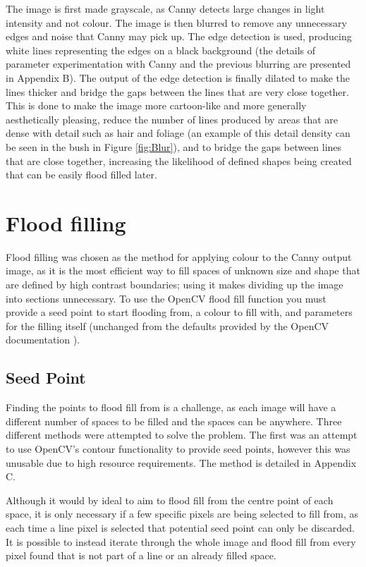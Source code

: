The image is first made grayscale, as Canny detects large changes in light intensity and not colour. The image is then blurred to remove any unnecessary edges and noise that Canny may pick up. The edge detection is used, producing white lines representing the edges on a black background (the details of parameter experimentation with Canny and the previous blurring are presented in Appendix B). The output of the edge detection is finally dilated to make the lines thicker and bridge the gaps between the lines that are very close together. This is done to make the image more cartoon-like and more generally aesthetically pleasing, reduce the number of lines produced by areas that are dense with detail such as hair and foliage (an example of this detail density can be seen in the bush in Figure \ref{fig:Blur}), and to bridge the gaps between lines that are close together, increasing the likelihood of defined shapes being created that can be easily flood filled later.

\section{Flood filling}

Flood filling was chosen as the method for applying colour to the Canny output image, as it is the most efficient way to fill spaces of unknown size and shape that are defined by high contrast boundaries; using it makes dividing up the image into sections unnecessary. To use the OpenCV flood fill function you must provide a seed point to start flooding from, a colour to fill with, and parameters for the filling itself (unchanged from the defaults provided by the OpenCV documentation \cite{opencvffilldemo}).

\subsection{Seed Point}

Finding the points to flood fill from is a challenge, as each image will have a different number of spaces to be filled and the spaces can be anywhere. Three different methods were attempted to solve the problem. The first was an attempt to use OpenCV's contour functionality to provide seed points, however this was unusable due to high resource requirements. The method is detailed in Appendix C.

Although it would by ideal to aim to flood fill from the centre point of each space, it is only necessary if a few specific pixels are being selected to fill from, as each time a line pixel is selected that potential seed point can only be discarded. It is possible to instead iterate through the whole image and flood fill from every pixel found that is not part of a line or an already filled space.

